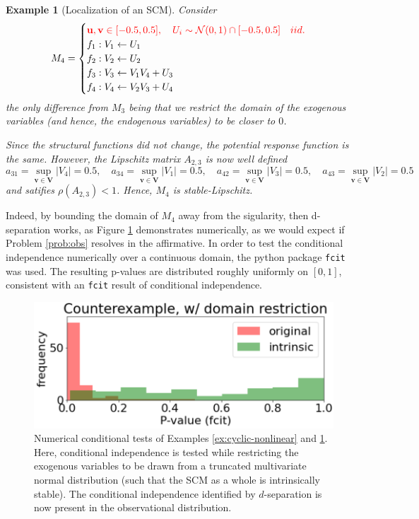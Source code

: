 \documentclass[letterpaper,10pt]{article}
\newtheorem{example}{Example}
\begin{document}
\begin{example}[Localization of an SCM]\label{ex:local}
Consider
\[
M_4 = 
\begin{cases}
\color{red}\mathbf{u}, \mathbf{v}\in [-0.5,0.5], \quad U_i \sim \mathcal{N}(0,1)\cap [-0.5,0.5] \quad iid. \color{black}\\
f_1:V_1\leftarrow U_1 \\
f_2:V_2\leftarrow U_2 \\
f_3:V_3\leftarrow V_1V_4+U_3 \\
f_4:V_4\leftarrow V_2V_3+U_4
\end{cases}
\]
the only difference from $M_3$ being that we restrict the domain of the exogenous variables (and hence, the endogenous variables) to be closer to $0$. 

Since the structural functions did not change, the potential response function is the same. However, the Lipschitz matrix $A_{2,3}$ is now well defined
\[
a_{31} = \sup_{\mathbf{v}\in\mathbf{V}}\lvert V_4\rvert = 0.5, \quad
a_{34} = \sup_{\mathbf{v}\in\mathbf{V}}\lvert V_1\rvert = 0.5,  \quad
a_{42} = \sup_{\mathbf{v}\in\mathbf{V}}\lvert V_3\rvert = 0.5,  \quad
a_{43} = \sup_{\mathbf{v}\in\mathbf{V}}\lvert V_2\rvert = 0.5 
\]
and satifies $\rho(A_{2,3})<1$. Hence, $M_4$ is stable-Lipschitz.
\end{example}

Indeed, by bounding the domain of $M_4$ away from the sigularity, then d-separation works, as Figure \ref{fig:counterexample_domain_restriction} demonstrates numerically, as we would expect if Problem \ref{prob:obs} resolves in the affirmative.
In order to test the conditional independence numerically over a continuous domain, the python package \verb|fcit| \cite{fcit} was used. The resulting p-values are distributed roughly uniformly on $[0,1]$, consistent with an \verb|fcit| result of conditional independence.


\begin{figure}
\centering
\includegraphics[width=.5\linewidth]{pics/my_own/counterexample_domain_restriction.png}
\caption{Numerical conditional tests of Examples \ref{ex:cyclic-nonlinear} and \ref{ex:local}. Here, conditional independence is tested while restricting the exogenous variables to be drawn from a truncated multivariate normal distribution (such that the SCM as a whole is intrinsically stable). The conditional independence identified by $d$-separation is now present in the observational distribution.}
\label{fig:counterexample_domain_restriction}
\end{figure}
\end{document}

